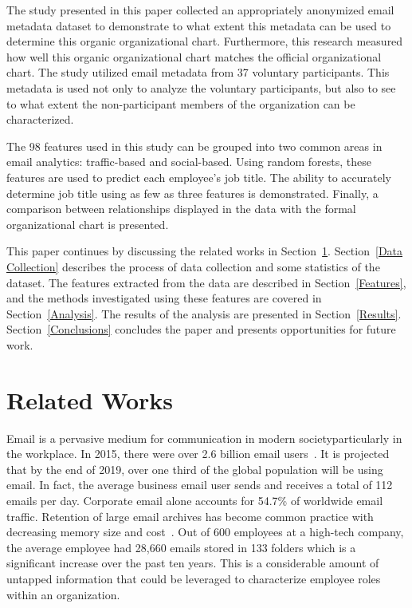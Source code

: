 \documentclass{article}
\begin{document}
The study presented in this paper collected an appropriately anonymized email metadata dataset to demonstrate to what extent this metadata can be used to determine this organic organizational chart.  Furthermore, this research measured how well this organic organizational chart matches the official organizational chart.  The study utilized email metadata from 37 voluntary participants.  This metadata is used not only to analyze the voluntary participants, but also to see to what extent the non-participant members of the organization can be characterized.

The 98 features used in this study can be grouped into two common areas in email analytics: traffic-based and social-based. Using random forests, these features are used to predict each employee's job title.  The ability to accurately determine job title using as few as three features is demonstrated.  Finally, a comparison between relationships displayed in the data with the formal organizational chart is presented.  

This paper continues by discussing the related works in Section~\ref{Related Works}.  Section~\ref{Data Collection} describes the process of data collection and some statistics of the dataset.  The features extracted from the data are described in Section~\ref{Features}, and the methods investigated using these features are covered in Section~\ref{Analysis}.  The results of the analysis are presented in Section~\ref{Results}.  Section~\ref{Conclusions} concludes the paper and presents opportunities for future work.  

\section{Related Works} \label{Related Works}

Email is a pervasive medium for communication in modern society\textemdash{}particularly in the workplace.  In 2015, there were over 2.6 billion email users~\cite{radicati_emails_2015}.  It is projected that by the end of 2019, over one third of the global population will be using email.  In fact, the average business email user sends and receives a total of 112 emails per day.  Corporate email alone accounts for 54.7\% of worldwide email traffic. Retention of large email archives has become common practice with decreasing memory size and cost~\cite{fisher_revisiting_2006}.  Out of 600 employees at a high-tech company, the average employee had 28,660 emails stored in 133 folders which is a significant increase over the past ten years.  This is a considerable amount of untapped information that could be leveraged to characterize employee roles within an organization.
\end{document}
